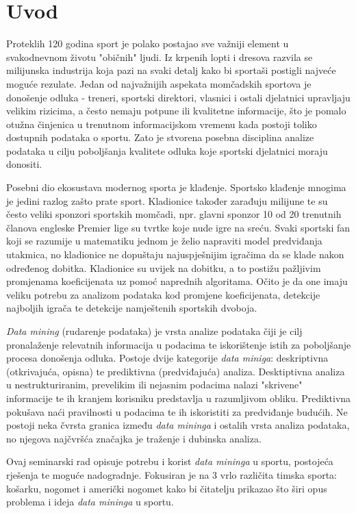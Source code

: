 \documentclass{ferseminar}
\begin{document}
\stvoripredstranice
\section{Uvod}

Proteklih 120 godina sport je polako postajao sve važniji element u svakodnevnom životu "običnih" ljudi. Iz krpenih lopti i dresova razvila se milijunska industrija koja pazi na svaki detalj kako bi sportaši postigli najveće moguće rezulate. Jedan od najvažnijih aspekata momčadskih sportova je donošenje odluka - treneri, sportski direktori, vlasnici i ostali djelatnici upravljaju velikim rizicima, a često nemaju potpune ili kvalitetne informacije, što je pomalo otužna činjenica u trenutnom informacijskom vremenu kada postoji toliko dostupnih podataka o sportu. Zato je stvorena posebna disciplina analize podataka u cilju poboljšanja kvalitete odluka koje sportski djelatnici moraju donositi.


Posebni dio ekosustava modernog sporta je klađenje. Sportsko klađenje mnogima je jedini razlog zašto prate sport. Kladionice također zarađuju milijune te su često veliki sponzori sportskih momčadi, npr. glavni sponzor 10 od 20 trenutnih članova engleske Premier lige su tvrtke koje nude igre na sreću. Svaki sportski fan koji se razumije u matematiku jednom je želio napraviti model predviđanja utakmica, no kladionice ne dopuštaju najuspješnijim igračima da se klade nakon određenog dobitka. Kladionice su uvijek na dobitku, a to postižu pažljivim promjenama koeficijenata uz pomoć naprednih algoritama. Očito je da one imaju veliku potrebu za analizom podataka kod promjene koeficijenata, detekcije najboljih igrača te detekcije namještenih sportskih dvoboja.


\textit{Data mining} (rudarenje podataka) je vrsta analize podataka čiji je cilj pronalaženje relevatnih informacija u podacima te iskorištenje istih za poboljšanje procesa donošenja odluka. Postoje dvije kategorije \textit{data miniga}: deskriptivna (otkrivajuća, opisna) te prediktivna (predviđajuća) analiza. Desktiptivna analiza u nestrukturiranim, prevelikim ili nejasnim podacima nalazi "skrivene" informacije te ih kranjem korisniku predstavlja u razumljivom obliku. Prediktivna pokušava naći pravilnosti u podacima te ih iskoristiti za predviđanje budućih. Ne postoji neka čvrsta granica između \textit{data mininga} i ostalih vrsta analiza podataka, no njegova najčvršća značajka je traženje i dubinska analiza.\cite{data}


Ovaj seminarski rad opisuje potrebu i korist \textit{data mininga} u sportu, postojeća rješenja te moguće nadogradnje. Fokusiran je na 3 vrlo različita timska sporta: košarku, nogomet i američki nogomet kako bi čitatelju prikazao što širi opus problema i ideja \textit{data mininga} u sportu.
\end{document}
